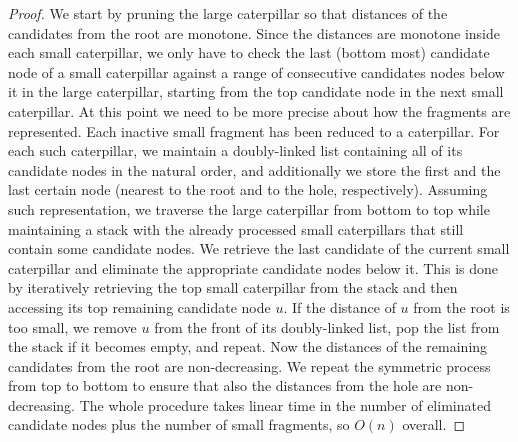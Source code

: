 \documentclass[a4paper,UKenglish]{lipics-v2016}
\theoremstyle{plain}
\begin{document}
\begin{proof}

We start by pruning the large caterpillar so that distances of the candidates from the root are
monotone. Since the distances are monotone inside each small caterpillar, we only have to check the last (bottom most) 
candidate node of a small caterpillar against a range of consecutive candidates nodes below it in the large
caterpillar, starting from the top candidate node in the next small caterpillar. 
At this point we need to be more precise about how the fragments are represented. Each inactive small
fragment has been reduced to a caterpillar. For each such caterpillar, we maintain a doubly-linked list containing
all of its candidate nodes in the natural order, and additionally we store the first and the last certain
node (nearest to the root and to the hole, respectively). Assuming such representation, we traverse
the large caterpillar from bottom to top while
maintaining a stack with the already processed small caterpillars that still contain some candidate nodes.
We retrieve the last candidate of the current small caterpillar and eliminate the appropriate candidate
nodes below it. This is done by iteratively retrieving the top small caterpillar from the stack and then
accessing its top remaining candidate node $u$. If the distance of $u$ from the root is too small, we
remove $u$ from the front of its doubly-linked list, pop the list from the stack if it becomes empty,
and repeat. Now the distances of the remaining candidates from the root are
non-decreasing. We repeat the symmetric process from top to bottom to ensure that also the distances
from the hole are non-decreasing. The whole procedure takes linear time in the number of eliminated
candidate nodes plus the number of small fragments, so $O(n)$ overall.


\end{proof}
\end{document}
